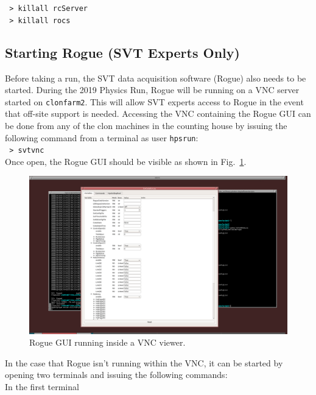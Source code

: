 \documentclass[12pt]{article}
\begin{document}
    \noindent
    \texttt{\hspace*{1cm} > killall rcServer} \\
    \texttt{\hspace*{1cm} > killall rocs}

\subsection{Starting Rogue (SVT Experts Only)}\label{sec:rogue}

Before taking a run, the SVT data acquisition software (Rogue) also needs to be 
started.  During the 2019 Physics Run, Rogue will be running on a VNC server 
started on \texttt{clonfarm2}. This will allow SVT experts access to Rogue
in the event that off-site support is needed. Accessing the VNC containing the
Rogue GUI can be done from any of the clon machines in the counting house
by issuing the following command from a terminal as user \texttt{hpsrun}: \\ 

    \noindent
    \texttt{\hspace*{1cm} > svtvnc} \\

\noindent
Once open, the Rogue GUI should be visible as shown in Fig.~\ref{fig:svtvnc}. 
\begin{figure}[htbp]
\begin{center}
    \includegraphics[width=.7\textwidth]{svtvnc.png}
\caption{Rogue GUI running inside a VNC viewer.}
\label{fig:svtvnc}
\end{center}
\end{figure}

\noindent
In the case that Rogue isn't running within the VNC, it can be started by 
opening two terminals and issuing the following commands: \\

\noindent
In the first terminal \\
\end{document}
